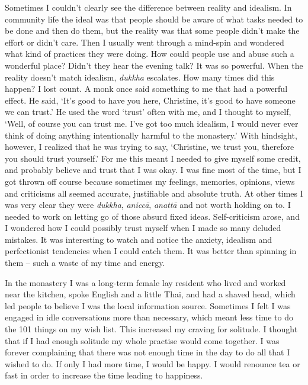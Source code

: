 Sometimes I couldn't clearly see the difference between reality and
idealism. In community life the ideal was that people should be aware of
what tasks needed to be done and then do them, but the reality was that
some people didn't make the effort or didn't care. Then I usually went
through a mind-spin and wondered what kind of practices they were doing. 
How could people use and abuse such a wonderful place? Didn't they hear
the evening talk? It was so powerful. When the reality doesn't match
idealism, \emph{dukkha} escalates. How many times did this happen? I
lost count. A monk once said something to me that had a powerful effect. 
He said, `It's good to have you here, Christine, it's good to have
someone we can trust.' He used the word `trust' often with me, and I
thought to myself, `Well, of course you can trust me. I've got too much
idealism, I would never ever think of doing anything intentionally
harmful to the monastery.' With hindsight, however, I realized that he
was trying to say, `Christine, we trust you, therefore you should trust
yourself.' For me this meant I needed to give myself some credit, and
probably believe and trust that I was okay. I was fine most of the time, 
but I got thrown off course because sometimes my feelings, memories, 
opinions, views and criticisms all seemed accurate, justifiable and
absolute truth. At other times I was very clear they were \emph{dukkha}, 
\emph{aniccā}, \emph{anattā} and not worth holding on to. I needed to
work on letting go of those absurd fixed ideas. Self-criticism arose, 
and I wondered how I could possibly trust myself when I made so many
deluded mistakes. It was interesting to watch and notice the anxiety, 
idealism and perfectionist tendencies when I could catch them. It was
better than spinning in them -- such a waste of my time and energy. 

In the monastery I was a long-term female lay resident who lived and
worked near the kitchen, spoke English and a little Thai, and had a
shaved head, which led people to believe I was the local information
source. Sometimes I felt I was engaged in idle conversations more than
necessary, which meant less time to do the 101 things on my wish list. 
This increased my craving for solitude. I thought that if I had enough
solitude my whole practise would come together. I was forever
complaining that there was not enough time in the day to do all that I
wished to do. If only I had more time, I would be happy. I would
renounce tea or fast in order to increase the time leading to happiness. 

